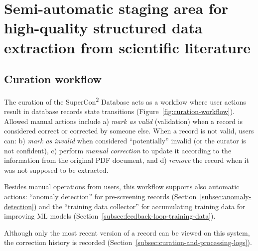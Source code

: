 \chapter{Semi-automatic staging area for high-quality structured data extraction from scientific literature}

\section{Curation workflow}
\label{sec:curation-workflow}
The curation of the SuperCon\textsuperscript{2} Database acts as a workflow where user actions result in database records state transitions (Figure~\ref{fig:curation-workflow}). 
Allowed manual actions include a) \textit{mark as valid} (validation) when a record is considered correct or corrected by someone else. When a record is not valid, users can: b) \textit{mark as invalid} when considered ``potentially'' invalid (or the curator is not confident), c) perform \textit{manual correction} to update it according to the information from the original PDF document, and d) \textit{remove} the record when it was not supposed to be extracted.

Besides manual operations from users, this workflow supports also automatic actions: ``anomaly detection'' for pre-screening records (Section~\ref{subsec:anomaly-detection}) and the ``training data collector'' for accumulating training data for improving ML models (Section~\ref{subsec:feedback-loop-training-data}). 


Although only the most recent version of a record can be viewed on this system, the correction history is recorded (Section~\ref{subsec:curation-and-processing-logs}). 



